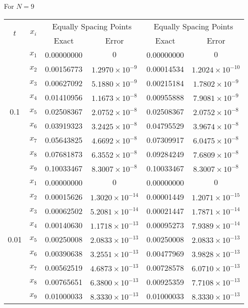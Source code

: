 \documentclass[12pt, a4paper]{article}
\begin{document}
 For \( N = 9 \)

\begin{table}[ht]
	\renewcommand{\arraystretch}{1.5}
	\centering
	\begin{tabular}{|c|c|c|c|c|c|}
		\hline
		\multirow{2}{*}{\( t \)} & \multirow{2}{*}{\( x_i \)} & \multicolumn{2}{c|}{Equally Spacing Points} & \multicolumn{2}{c|}{Equally Spacing Points} \\
		\cline{3-6}
		& & Exact & Error & Exact & Error \\
		\hline
		\multirow{9}{*}{0.1} & \( x_1 \) & 0.00000000 & \( 0 \) & 0.00000000 & \( 0 \) \\
		& \( x_2 \) & 0.00156773 & \( 1.2970 \times 10^{-9} \) & 0.00014534 & \( 1.2024 \times 10^{-10} \) \\
		& \( x_3 \) & 0.00627092 & \( 5.1880 \times 10^{-9} \) & 0.00215184 & \( 1.7802 \times 10^{-9} \) \\
		& \( x_4 \) & 0.01410956 & \( 1.1673 \times 10^{-8} \) & 0.00955888 & \( 7.9081 \times 10^{-9} \) \\
		& \( x_5 \) & 0.02508367 & \( 2.0752 \times 10^{-8} \) & 0.02508367 & \( 2.0752 \times 10^{-8} \) \\
		& \( x_6 \) & 0.03919323 & \( 3.2425 \times 10^{-8} \) & 0.04795529 & \( 3.9674 \times 10^{-8} \) \\
		& \( x_7 \) & 0.05643825 & \( 4.6692 \times 10^{-8} \) & 0.07309917 & \( 6.0475 \times 10^{-8} \) \\
		& \( x_8 \) & 0.07681873 & \( 6.3552 \times 10^{-8} \) & 0.09284249 & \( 7.6809 \times 10^{-8} \) \\
		& \( x_9 \) & 0.10033467 & \( 8.3007 \times 10^{-8} \) & 0.10033467 & \( 8.3007 \times 10^{-8} \) \\
		\hline
		\multirow{9}{*}{0.01} & \( x_1 \) & 0.00000000 & \( 0 \) & 0.00000000 & \( 0 \) \\
		& \( x_2 \) & 0.00015626 & \( 1.3020 \times 10^{-14} \) & 0.00001449 & \( 1.2071 \times 10^{-15} \) \\
		& \( x_3 \) & 0.00062502 & \( 5.2081 \times 10^{-14} \) & 0.00021447 & \( 1.7871 \times 10^{-14} \) \\
		& \( x_4 \) & 0.00140630 & \( 1.1718 \times 10^{-13} \) & 0.00095273 & \( 7.9389 \times 10^{-14} \) \\
		& \( x_5 \) & 0.00250008 & \( 2.0833 \times 10^{-13} \) & 0.00250008 & \( 2.0833 \times 10^{-13} \) \\
		& \( x_6 \) & 0.00390638 & \( 3.2551 \times 10^{-13} \) & 0.00477969 & \( 3.9828 \times 10^{-13} \) \\
		& \( x_7 \) & 0.00562519 & \( 4.6873 \times 10^{-13} \) & 0.00728578 & \( 6.0710 \times 10^{-13} \) \\
		& \( x_8 \) & 0.00765651 & \( 6.3800 \times 10^{-13} \) & 0.00925359 & \( 7.7108 \times 10^{-13} \) \\
		& \( x_9 \) & 0.01000033 & \( 8.3330 \times 10^{-13} \) & 0.01000033 & \( 8.3330 \times 10^{-13} \) \\
		\hline
	\end{tabular}
\end{table}
\end{document}
